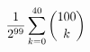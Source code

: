 \documentclass[preview]{standalone}
\begin{document}
\begin{align*}
\special{dvisvgm:raw <g id='unique000'>}\frac{1}{2^{99}}\sum_{k=0}^{40}\binom{100}{k}\special{dvisvgm:raw </g>}
\end{align*}
\end{document}
